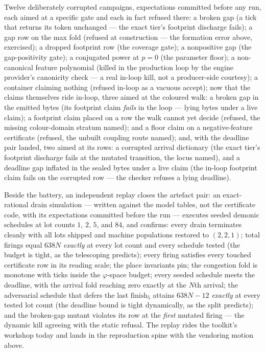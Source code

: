 Twelve deliberately corrupted campaigns, expectations committed
before any run, each aimed at a specific gate and each in fact
refused there: a broken gap (a tick that returns its token
unchanged --- the exact tier's footprint discharge fails); a gap row
on the max fold (refused at construction --- the formation error
above, exercised); a dropped footprint row (the coverage gate); a
nonpositive gap (the gap-positivity gate); a conjugated power at
$p = 0$ (the parameter floor); a non-canonical feature polynomial
(killed in the production loop by the engine provider's canonicity
check --- a real in-loop kill, not a producer-side courtesy); a
container claiming nothing (refused in-loop as a vacuous accept);
now that the claims themselves ride in-loop, three aimed at
the coloured walk: a broken gap in the emitted bytes (its footprint
claim \emph{fails} in the loop --- lying bytes under a live claim);
a footprint claim placed on a row the walk cannot yet decide
(refused, the missing colour-domain stratum named); and a floor
claim on a negative-feature certificate (refused, the unbuilt
coupling route named); and, with the deadline pair landed, two
aimed at its rows: a corrupted arrival dictionary (the exact tier's
footprint discharge fails at the mutated transition, the locus
named), and a deadline gap inflated in the sealed bytes under a
live claim (the in-loop footprint claim fails on the corrupted row
--- the checker refuses a lying deadline).

Beside the battery, an independent replay closes the artefact pair:
an exact-rational drain simulation --- written against the model
tables, not the certificate code, with its expectations committed
before the run --- executes seeded demonic schedules at lot counts
$1$, $2$, $5$, and $84$, and confirms: every drain terminates
cleanly with all lots shipped and machine populations restored to
$(2,2,1)$; total firings equal $638N$ \emph{exactly} at every lot
count and every schedule tested (the budget is tight, as the
telescoping predicts); every firing satisfies every touched
certificate row in its reading scale; the place invariants pin;
the congestion fold is monotone with ticks inside the
$\varphi$-space budget; every seeded schedule meets the deadline,
with the arrival fold reaching zero exactly at the $N$th arrival;
the adversarial schedule that defers the last $\mathrm{finish}_5$
attains $638N - 12$ \emph{exactly} at every tested lot count (the
deadline bound is tight dynamically, as the split predicts); and
the broken-gap mutant violates its row
at the \emph{first} mutated firing --- the dynamic kill agreeing
with the static refusal. The replay rides the toolkit's workshop
today and lands in the reproduction spine with the vendoring motion
above.

